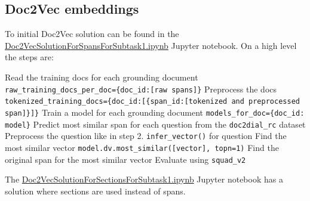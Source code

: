 \documentclass[11pt]{article}
\begin{document}
    \subsection{Doc2Vec embeddings}\label{subsec:doc2vec-experiment}
    To initial Doc2Vec solution can be found in the \href{https://github.com/isabelladegen/nlp-2021/blob/main/notebooks/Doc2VecSolutionForSpansForSubtask1.ipynb}{Doc2VecSolutionForSpansForSubtask1.ipynb}
    Jupyter notebook.
    On a high level the steps are:
    \begin{outline}[enumerate]
        \1 Read the training docs for each grounding document \texttt{raw\_training\_docs\_per\_doc=\{doc\_id:[raw spans]\}}
        \1 Preprocess the docs \texttt{tokenized\_training\_docs=\{doc\_id:[\{span\_id:[tokenized and preprocessed span]\}]\}}
        \1 Train a model for each grounding document \texttt{models\_for\_doc=\{doc\_id: model\}}
        \1 Predict most similar span for each question from the \texttt{doc2dial\_rc} dataset
        \2 Preprocess the question like in step 2.
        \2 \texttt{infer\_vector()} for question
        \2 Find the most similar vector \texttt{model.dv.most\_similar([vector], topn=1)}
        \2 Find the original span for the most similar vector
        \1 Evaluate using \texttt{squad\_v2}
    \end{outline}

    The \href{https://github.com/isabelladegen/nlp-2021/blob/main/notebooks/Doc2VecSolutionForSectionsForSubtask1.ipynb}{Doc2VecSolutionForSectionsForSubtask1.ipynb}
    Jupyter notebook has a solution where sections are used instead of spans.
\end{document}

